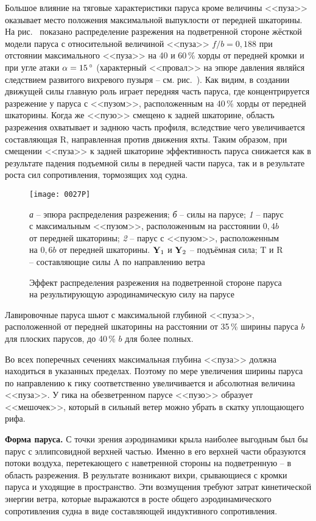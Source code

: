 Большое влияние на тяговые характеристики паруса кроме величины
<<пуза>> оказывает место положения максимальной выпуклости от передней
шкаторины. На рис.~ показано распределение разрежения на
подветренной стороне жёсткой модели паруса с относительной величиной
<<пуза>> $f/b = 0,188$ при отстоянии максимального <<пуза>> на 40 и
60\,\% хорды от передней кромки и при угле атаки $\alpha = 15\,^\circ$
(характерный <<провал>> на эпюре давления являйся следствием развитого
вихревого пузыря \--- см. рис.~). Как видим, в создании
движущей силы главную роль играет передняя часть паруса, где
концентрируется разрежение у паруса с <<пузом>>, расположенным на
40\,\% хорды от передней шкаторины. Когда же <<пузо>> смещено к задней
шкаторине, область разрежения охватывает и заднюю часть профиля,
вследствие чего увеличивается составляющая \ve R, направленная против
движения яхты. Таким образом, при смещении <<пуза>> к задней шкаторине
эффективность паруса снижается как в результате падения подъемной силы
в передней части паруса, так и в результате роста сил сопротивления,
тормозящих ход судна.

\begin{figure}[!htb]
  \centering
  \texttt{[image: 0027P]}
  \caption{Эффект распределения разрежения на подветренной стороне паруса на результирующую аэродинамическую силу на парусе}
  \label{fig:27}
  \small
  \centering{}
  \textit{а} \--- эпюра распределения разрежения; \textit{б} \--- силы на парусе; \textit{1} \--- парус с максимальным <<пузом>>, расположенным на расстоянии $0,4 b$ от передней шкаторины; \textit{2} \--- парус с <<пузом>>, расположенным на $0,6 b$ от передней шкаторины. $\mathbf{Y}_1$ и $\mathbf{Y}_2$ \--- подъёмная сила; \ve T и \ve R \--- составляющие силы \ve A по направлению ветра
\end{figure}

Лавировочные паруса шьют с максимальной глубиной <<пуза>>,
расположенной от передней шкаторины на расстоянии от 35\,\%
ширины паруса $b$ для плоских парусов, до 40\,\% $b$ для более
полных.

Во всех поперечных сечениях максимальная глубина <<пуза>> должна
находиться в указанных пределах. Поэтому по мере увеличения ширины
паруса по направлению к гику соответственно увеличивается и абсолютная
величина <<пуза>>. У гика на обезветренном парусе <<пузо>> образует
<<мешочек>>, который в сильный ветер можно убрать в скатку уплощающего
рифа.

\textbf{Форма паруса.} С точки зрения аэродинамики
крыла наиболее выгодным был бы парус с эллипсовидной верхней
частью. Именно в его верхней части образуются потоки воздуха,
перетекающего с наветренной стороны на подветренную \--- в область
разрежения. В результате возникают вихри, срывающиеся с кромки паруса
и уходящие в пространство. Эти возмущения требуют затрат кинетической
энергии ветра, которые выражаются в росте общего аэродинамического
сопротивления судна в виде составляющей индуктивного сопротивления.

